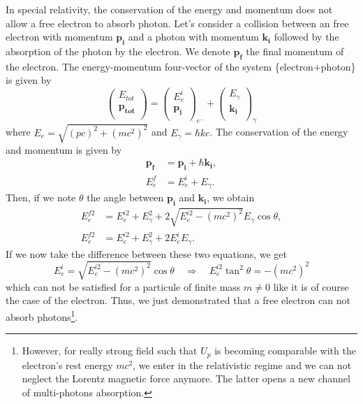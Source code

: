 \documentclass[a4paper]{article}
\begin{document}
In special relativity, the conservation of the energy and momentum does not allow a free electron to absorb photon.
Let's consider a collision between an free electron with momentum $\mathbf{p_{i}}$ and a photon with momentum $\mathbf{k_{i}}$ followed by the absorption of the photon by the electron. We denote $\mathbf{p_{f}}$ the final momentum of the electron. The energy-momentum four-vector of the system \{electron$+$photon\} is given by
\begin{equation}
\left(
\begin{array}{c}
E_{tot}\\
\mathbf{p_{tot}}\\
\end{array}
\right)
=
\left(
\begin{array}{c}
E_{e}^{i}\\
\mathbf{p_{i}}\\
\end{array}
\right)_{e^{-}}
+\left(
\begin{array}{c}
E_{\gamma}\\
\mathbf{k_{i}}\\
\end{array}
\right)_{\gamma}
\end{equation}
where $E_{e}=\sqrt{(pc)^{2}+(mc^{2})^{2}}$ and $E_{\gamma}=\hbar kc$.
The conservation of the energy and momentum is given by
\begin{align}
\label{momentum_conservation}
\mathbf{p_{f}}&=\mathbf{p_{i}}+\hbar \mathbf{k_{i}}, \\
\label{energy_conservation}
E_{e}^{f}&=E_{e}^{i}+E_{\gamma}.
\end{align}
Then, if we note $\theta$ the angle between $\mathbf{p_{i}}$ and $\mathbf{k_{i}}$, we obtain
\begin{align}
E_{e}^{f2}&=E_{e}^{i2}+E_{\gamma}^{2}+2\sqrt{E_{e}^{i2}-(mc^{2})^{2}}E_{\gamma}\cos{\theta}, \\
E_{e}^{f2}&=E_{e}^{i2}+E_{\gamma}^{2}+2 E_{e}^{i}E_{\gamma}.
\end{align}
If we now take the difference between these two equations, we get
\begin{equation}
E_{e}^{i}=\sqrt{E_{e}^{i2}-(mc^{2})^{2}}\cos{\theta} \quad \Rightarrow \quad E_{e}^{i2} \tan^{2}{\theta} = -(mc^{2})^{2}
\end{equation}
which can not be satisfied for a particule of finite mass $m\neq0$ like it is of course the case of the electron. Thus, we just demonstrated that a free electron can not absorb photons\footnote{However, for really strong field such that $U_{p}$ is becoming comparable with the electron's rest energy $mc^{2}$, we enter in the relativistic regime and we can not neglect the Lorentz magnetic force anymore. The latter opens a new channel of multi-photons absorption.}.




\end{document}
